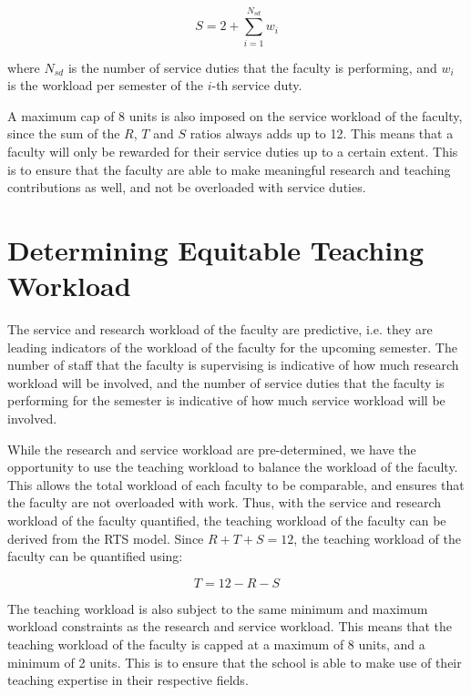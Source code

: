 \begin{equation}
  S = 2 + \sum_{i=1}^{N_{sd}} w_i
\end{equation}

where $N_{sd}$ is the number of service duties that the faculty is performing, and $w_i$ is the workload per semester of the $i$-th service duty.

A maximum cap of 8 units is also imposed on the service workload of the faculty, since the sum of the $R$, $T$ and $S$ ratios always adds up to 12. This means that a faculty will only be rewarded for their service duties up to a certain extent. This is to ensure that the faculty are able to make meaningful research and teaching contributions as well, and not be overloaded with service duties.

\section{Determining Equitable Teaching Workload}

The service and research workload of the faculty are predictive, i.e. they are leading indicators of the workload of the faculty for the upcoming semester. The number of staff that the faculty is supervising is indicative of how much research workload will be involved, and the number of service duties that the faculty is performing for the semester is indicative of how much service workload will be involved.

While the research and service workload are pre-determined, we have the opportunity to use the teaching workload to balance the workload of the faculty. This allows the total workload of each faculty to be comparable, and ensures that the faculty are not overloaded with work. Thus, with the service and research workload of the faculty quantified, the teaching workload of the faculty can be derived from the RTS model. Since $R + T + S = 12$, the teaching workload of the faculty can be quantified using:

\begin{equation}
  T = 12 - R - S
\end{equation}

The teaching workload is also subject to the same minimum and maximum workload constraints as the research and service workload. This means that the teaching workload of the faculty is capped at a maximum of 8 units, and a minimum of 2 units. This is to ensure that the school is able to make use of their teaching expertise in their respective fields.


